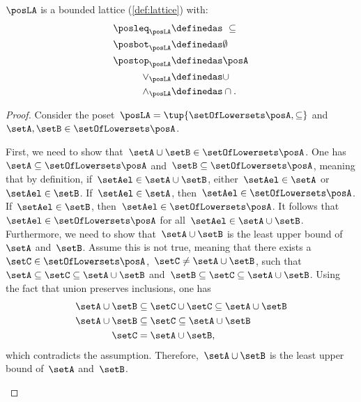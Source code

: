 \begin{lemma}
    $\posLA$ is a bounded lattice (\cref{def:lattice}) with:
    \begin{equation}
        \begin{aligned}
            \posleq_{\posLA}&\definedas \ \subseteq\\
            \posbot_{\posLA}&\definedas \emptyset\\
            \postop_{\posLA}&\definedas \posA\\
            \vee_{\posLA}&\definedas \cup\\
            \wedge_{\posLA}&\definedas \cap.
        \end{aligned}
    \end{equation}
\end{lemma}
\begin{proof}
    Consider the poset~$\posLA=\tup{\setOfLowersets \posA,\subseteq}$ and~$\setA,\setB\in \setOfLowersets \posA$.
    \begin{compactitem}
        \item First, we need to show that~$\setA\cup \setB\in \setOfLowersets \posA$.
        One has~$\setA \subseteq \setOfLowersets \posA$ and~$\setB\subseteq \setOfLowersets \posA$, meaning that by definition, if~$\setAel\in \setA\cup \setB$, either~$\setAel\in \setA$ or~$\setAel\in \setB$.
        If~$\setAel\in \setA$, then~$\setAel\in \setOfLowersets \posA$.
        If~$\setAel\in \setB$, then~$\setAel\in \setOfLowersets \posA$.
        It follows that~$\setAel\in \setOfLowersets \posA$ for all~$\setAel\in \setA\cup \setB$.
        Furthermore, we need to show that~$\setA\cup \setB$ is the least upper bound of~$\setA$ and~$\setB$.
        Assume this is not true, meaning that there exists a~$\setC\in \setOfLowersets \posA$,~$\setC\neq \setA\cup \setB$, such that~$\setA\subseteq \setC\subseteq \setA\cup \setB$ and~$\setB\subseteq \setC\subseteq \setA\cup \setB$.
        Using the fact that union preserves inclusions, one has
        \begin{equation}
            \begin{aligned}
                \setA\cup \setB &\subseteq \setC\cup \setC \subseteq \setA\cup \setB\\
                \setA\cup \setB &\subseteq \setC \subseteq \setA\cup \setB\\
                \setC&= \setA\cup \setB,
            \end{aligned}
        \end{equation}
        which contradicts the assumption. Therefore,~$\setA\cup \setB$ is the least upper bound of~$\setA$ and~$\setB$.

\end{compactitem}
\end{proof}
